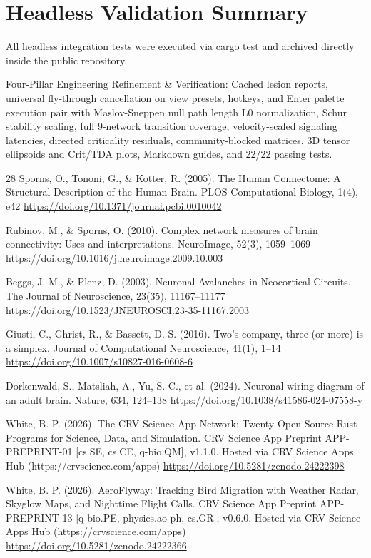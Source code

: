 \documentclass[10pt,letterpaper]{article}
\begin{document}
\section{Headless Validation Summary}
All headless integration tests were executed via cargo test and archived directly inside the public repository.

Four-Pillar Engineering Refinement \& Verification: Cached lesion reports, universal fly-through cancellation on view presets, hotkeys, and Enter palette execution pair with Maslov-Sneppen null path length L0 normalization, Schur stability scaling, full 9-network transition coverage, velocity-scaled signaling latencies, directed criticality residuals, community-blocked matrices, 3D tensor ellipsoids and Crit/TDA plots, Markdown guides, and 22/22 passing tests.

\begin{thebibliography}{28}
 Sporns, O., Tononi, G., \& Kotter, R. (2005). The Human Connectome: A Structural Description of the Human Brain. PLOS Computational Biology, 1(4), e42 \url{https://doi.org/10.1371/journal.pcbi.0010042}

 Rubinov, M., \& Sporns, O. (2010). Complex network measures of brain connectivity: Uses and interpretations. NeuroImage, 52(3), 1059--1069 \url{https://doi.org/10.1016/j.neuroimage.2009.10.003}

 Beggs, J. M., \& Plenz, D. (2003). Neuronal Avalanches in Neocortical Circuits. The Journal of Neuroscience, 23(35), 11167--11177 \url{https://doi.org/10.1523/JNEUROSCI.23-35-11167.2003}

 Giusti, C., Ghrist, R., \& Bassett, D. S. (2016). Two's company, three (or more) is a simplex. Journal of Computational Neuroscience, 41(1), 1--14 \url{https://doi.org/10.1007/s10827-016-0608-6}

 Dorkenwald, S., Matsliah, A., Yu, S. C., et al. (2024). Neuronal wiring diagram of an adult brain. Nature, 634, 124--138 \url{https://doi.org/10.1038/s41586-024-07558-y}

 White, B. P. (2026). The CRV Science App Network: Twenty Open-Source Rust Programs for Science, Data, and Simulation. CRV Science App Preprint APP-PREPRINT-01 [cs.SE, cs.CE, q-bio.QM], v1.1.0. Hosted via CRV Science Apps Hub (https://crvscience.com/apps) \url{https://doi.org/10.5281/zenodo.24222398}

 White, B. P. (2026). AeroFlyway: Tracking Bird Migration with Weather Radar, Skyglow Maps, and Nighttime Flight Calls. CRV Science App Preprint APP-PREPRINT-13 [q-bio.PE, physics.ao-ph, cs.GR], v0.6.0. Hosted via CRV Science Apps Hub (https://crvscience.com/apps) \url{https://doi.org/10.5281/zenodo.24222366}


\end{thebibliography}
\end{document}
